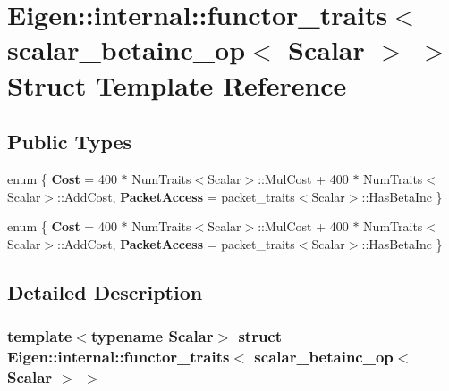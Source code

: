 \hypertarget{struct_eigen_1_1internal_1_1functor__traits_3_01scalar__betainc__op_3_01_scalar_01_4_01_4}{}\section{Eigen\+:\+:internal\+:\+:functor\+\_\+traits$<$ scalar\+\_\+betainc\+\_\+op$<$ Scalar $>$ $>$ Struct Template Reference}
\label{struct_eigen_1_1internal_1_1functor__traits_3_01scalar__betainc__op_3_01_scalar_01_4_01_4}
\subsection*{Public Types}
\begin{DoxyCompactItemize}
\item 
\mbox{\label{struct_eigen_1_1internal_1_1functor__traits_3_01scalar__betainc__op_3_01_scalar_01_4_01_4_aa89adf80d849299b1110e44b5680a957}} 
enum \{ {\bfseries Cost} = 400 $\ast$ Num\+Traits$<$Scalar$>$\+:\+:Mul\+Cost + 400 $\ast$ Num\+Traits$<$Scalar$>$\+:\+:Add\+Cost, 
{\bfseries Packet\+Access} = packet\+\_\+traits$<$Scalar$>$\+:\+:Has\+Beta\+Inc
 \}
\item 
\mbox{\label{struct_eigen_1_1internal_1_1functor__traits_3_01scalar__betainc__op_3_01_scalar_01_4_01_4_a38c48dd4dd2b2e9743c7615642fa7f7a}} 
enum \{ {\bfseries Cost} = 400 $\ast$ Num\+Traits$<$Scalar$>$\+:\+:Mul\+Cost + 400 $\ast$ Num\+Traits$<$Scalar$>$\+:\+:Add\+Cost, 
{\bfseries Packet\+Access} = packet\+\_\+traits$<$Scalar$>$\+:\+:Has\+Beta\+Inc
 \}
\end{DoxyCompactItemize}


\subsection{Detailed Description}
\subsubsection*{template$<$typename Scalar$>$\newline
struct Eigen\+::internal\+::functor\+\_\+traits$<$ scalar\+\_\+betainc\+\_\+op$<$ Scalar $>$ $>$}



